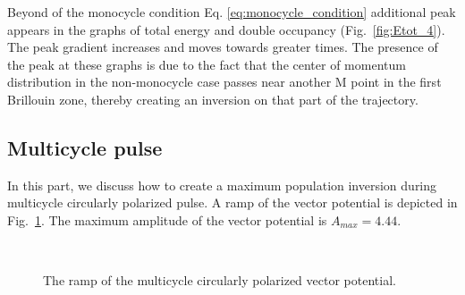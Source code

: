 Beyond of the monocycle condition Eq. \eqref{eq:monocycle_condition}  additional peak appears in the graphs of total energy and double occupancy (Fig.~\ref{fig:Etot_4}). The peak gradient increases and moves towards greater times. The presence of the peak at these graphs is due to the fact that the center of momentum distribution in the non-monocycle case passes near another M point in the first Brillouin zone, thereby creating an inversion on that part of the trajectory. 

\FloatBarrier

\subsection{Multicycle pulse}

In this part, we discuss how to create a maximum population inversion during multicycle circularly polarized pulse. A ramp of the vector potential is depicted in Fig.~\ref{fig:Pulses_5}. The maximum amplitude of the vector potential is $A_{max}=4.44$. 
\begin{figure}[h!]
 \\
\caption{The ramp of the multicycle circularly polarized vector potential.}
\label{fig:Pulses_5}
\end{figure}

